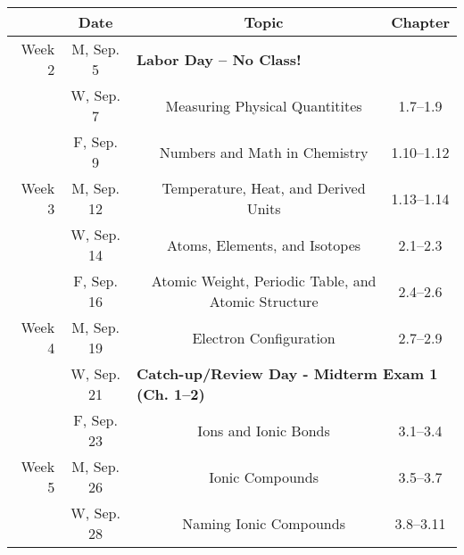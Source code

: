 \documentclass[12pt, letterpaper]{article}
\begin{document}
\noindent\begin{tabular}{rcccc}
	       & Date       &                                                                              & Topic                                               & Chapter    \\
	\midrule
	Week 2 & M, Sep. 5  & \multicolumn{3}{l}{\textbf{Labor Day -- No Class!}}                                                                                             \\
	       & W, Sep. 7  &                                                                              & Measuring Physical Quantitites                      & 1.7--1.9   \\
	       & F, Sep. 9  &                                                                              & Numbers and Math in Chemistry                       & 1.10--1.12 \\
	\midrule
	Week 3 & M, Sep. 12 &                                                                              & Temperature, Heat, and Derived Units                & 1.13--1.14 \\
	       & W, Sep. 14 &                                                                              & Atoms, Elements, and Isotopes                       & 2.1--2.3   \\
	       & F, Sep. 16 &                                                                              & Atomic Weight, Periodic Table, and Atomic Structure & 2.4--2.6   \\
	\midrule
	Week 4 & M, Sep. 19 &                                                                              & Electron Configuration                              & 2.7--2.9   \\
	       & W, Sep. 21 & \multicolumn{3}{l}{\textbf{Catch-up/Review Day - Midterm Exam 1 (Ch. 1--2)}}                                                                    \\
	       & F, Sep. 23 &                                                                              & Ions and Ionic Bonds                                & 3.1--3.4   \\
	\midrule
	Week 5 & M, Sep. 26 &                                                                              & Ionic Compounds                                     & 3.5--3.7   \\
	       & W, Sep. 28 &                                                                              & Naming Ionic Compounds                              & 3.8--3.11  \\

\end{tabular}
\end{document}
